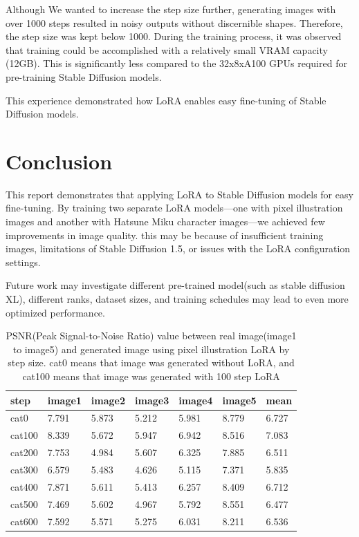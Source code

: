 \documentclass[extendedabs]{bmvc2k}
\begin{document}
Although We wanted to increase the step size further, generating images with over 1000 steps resulted in noisy outputs without discernible shapes. Therefore, the step size was kept below 1000. During the training process, it was observed that training could be accomplished with a relatively small VRAM capacity (12GB). This is significantly less compared to the 32x8xA100 GPUs required for pre-training Stable Diffusion models.

This experience demonstrated how LoRA enables easy fine-tuning of Stable Diffusion models.

\section{Conclusion}
This report demonstrates that applying LoRA to Stable Diffusion models for easy fine-tuning. By training two separate LoRA models—one with pixel illustration images and another with Hatsune Miku character images—we achieved few improvements in image quality. this may be because of insufficient training images, limitations of Stable Diffusion 1.5, or issues with the LoRA configuration settings.

Future work may investigate different pre-trained model(such as stable diffusion XL\cite{stablediffusion}), different ranks, dataset sizes, and training schedules may lead to even more optimized performance.

\begin{table}[]
\centering
\begin{tabular}{|l|l|l|l|l|l|l|}
\hline
step   & image1 & image2 & image3 & image4 & image5 & mean  \\ \hline
cat0   & 7.791  & 5.873  & 5.212  & 5.981  & 8.779  & 6.727 \\ \hline
cat100 & 8.339  & 5.672  & 5.947  & 6.942  & 8.516  & 7.083 \\ \hline
cat200 & 7.753  & 4.984  & 5.607  & 6.325  & 7.885  & 6.511 \\ \hline
cat300 & 6.579  & 5.483  & 4.626  & 5.115  & 7.371  & 5.835 \\ \hline
cat400 & 7.871  & 5.611  & 5.413  & 6.257  & 8.409  & 6.712 \\ \hline
cat500 & 7.469  & 5.602  & 4.967  & 5.792  & 8.551  & 6.477 \\ \hline
cat600 & 7.592  & 5.571  & 5.275  & 6.031  & 8.211  & 6.536 \\ \hline
\end{tabular}
\caption{PSNR(Peak Signal-to-Noise Ratio) value between real image(image1 to image5) and generated image using pixel illustration LoRA by step size. cat0 means that image was generated without LoRA, and cat100 means that image was generated with 100 step LoRA}
\label{tab:pixel-psnr}
\end{table}
\end{document}

